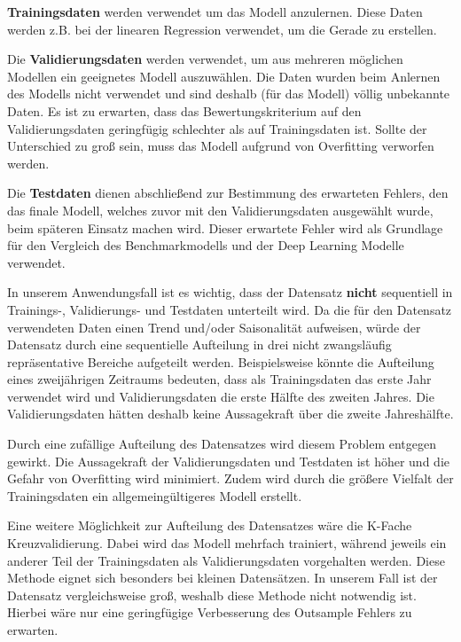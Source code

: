 \textbf{Trainingsdaten} werden verwendet um das Modell anzulernen. Diese Daten werden z.B. bei der linearen Regression verwendet, um die Gerade zu erstellen.

Die \textbf{Validierungsdaten} werden verwendet, um aus mehreren möglichen Modellen ein geeignetes Modell auszuwählen. Die Daten wurden beim Anlernen des Modells nicht verwendet und sind deshalb (für das Modell) völlig unbekannte Daten. Es ist zu erwarten, dass das Bewertungskriterium auf den Validierungsdaten geringfügig schlechter als auf Trainingsdaten ist. Sollte der Unterschied zu groß sein, muss das Modell aufgrund von Overfitting verworfen werden. 

Die \textbf{Testdaten} dienen abschließend zur Bestimmung des erwarteten Fehlers, den das finale Modell, welches zuvor mit den Validierungsdaten ausgewählt wurde, beim späteren Einsatz machen wird. Dieser erwartete Fehler wird als Grundlage für den Vergleich des Benchmarkmodells und der Deep Learning Modelle verwendet.

In unserem Anwendungsfall ist es wichtig, dass der Datensatz \textbf{nicht} sequentiell in Trainings-, Validierungs- und Testdaten unterteilt wird. Da die für den Datensatz verwendeten Daten einen Trend und/oder Saisonalität aufweisen, würde der Datensatz durch eine sequentielle Aufteilung in drei nicht zwangsläufig repräsentative Bereiche aufgeteilt werden. Beispielsweise könnte die Aufteilung eines zweijährigen Zeitraums bedeuten, dass als Trainingsdaten das erste Jahr verwendet wird und Validierungsdaten die erste Hälfte des zweiten Jahres. Die Validierungsdaten hätten deshalb keine Aussagekraft über die zweite Jahreshälfte.

Durch eine zufällige Aufteilung des Datensatzes wird diesem Problem entgegen gewirkt. Die Aussagekraft der Validierungsdaten und Testdaten ist höher und die Gefahr von Overfitting wird minimiert. Zudem wird durch die größere Vielfalt der Trainingsdaten ein allgemeingültigeres Modell erstellt.

Eine weitere Möglichkeit zur Aufteilung des Datensatzes wäre die K-Fache Kreuzvalidierung. Dabei wird das Modell mehrfach trainiert, während jeweils ein anderer Teil der Trainingsdaten als Validierungsdaten vorgehalten werden. Diese Methode eignet sich besonders bei kleinen Datensätzen. In unserem Fall ist der Datensatz vergleichsweise groß, weshalb diese Methode nicht notwendig ist. Hierbei wäre nur eine geringfügige Verbesserung des Outsample Fehlers zu erwarten.